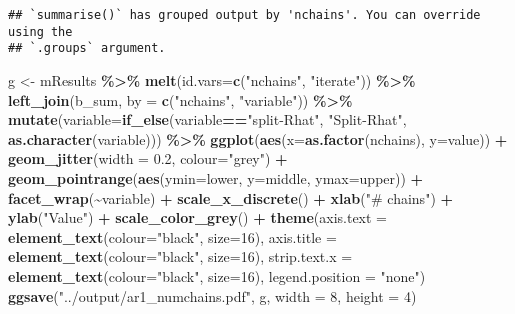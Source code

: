 \documentclass[
]{article}
\newenvironment{Shaded}{\begin{snugshade}}{\end{snugshade}}
\newcommand{\AttributeTok}[1]{\textcolor[rgb]{0.13,0.29,0.53}{#1}}
\newcommand{\DecValTok}[1]{\textcolor[rgb]{0.00,0.00,0.81}{#1}}
\newcommand{\FloatTok}[1]{\textcolor[rgb]{0.00,0.00,0.81}{#1}}
\newcommand{\FunctionTok}[1]{\textcolor[rgb]{0.13,0.29,0.53}{\textbf{#1}}}
\newcommand{\NormalTok}[1]{#1}
\newcommand{\OtherTok}[1]{\textcolor[rgb]{0.56,0.35,0.01}{#1}}
\newcommand{\SpecialCharTok}[1]{\textcolor[rgb]{0.81,0.36,0.00}{\textbf{#1}}}
\newcommand{\StringTok}[1]{\textcolor[rgb]{0.31,0.60,0.02}{#1}}
\begin{document}
\begin{verbatim}
## `summarise()` has grouped output by 'nchains'. You can override using the
## `.groups` argument.
\end{verbatim}

\begin{Shaded}
\begin{Highlighting}[]
\NormalTok{g }\OtherTok{\textless{}{-}}\NormalTok{ mResults }\SpecialCharTok{\%\textgreater{}\%} 
  \FunctionTok{melt}\NormalTok{(}\AttributeTok{id.vars=}\FunctionTok{c}\NormalTok{(}\StringTok{"nchains"}\NormalTok{, }\StringTok{"iterate"}\NormalTok{)) }\SpecialCharTok{\%\textgreater{}\%} 
  \FunctionTok{left\_join}\NormalTok{(b\_sum, }\AttributeTok{by =} \FunctionTok{c}\NormalTok{(}\StringTok{"nchains"}\NormalTok{, }\StringTok{"variable"}\NormalTok{)) }\SpecialCharTok{\%\textgreater{}\%} 
  \FunctionTok{mutate}\NormalTok{(}\AttributeTok{variable=}\FunctionTok{if\_else}\NormalTok{(variable}\SpecialCharTok{==}\StringTok{"split{-}Rhat"}\NormalTok{, }\StringTok{"Split{-}Rhat"}\NormalTok{, }\FunctionTok{as.character}\NormalTok{(variable))) }\SpecialCharTok{\%\textgreater{}\%} 
  \FunctionTok{ggplot}\NormalTok{(}\FunctionTok{aes}\NormalTok{(}\AttributeTok{x=}\FunctionTok{as.factor}\NormalTok{(nchains), }\AttributeTok{y=}\NormalTok{value)) }\SpecialCharTok{+}
  \FunctionTok{geom\_jitter}\NormalTok{(}\AttributeTok{width =} \FloatTok{0.2}\NormalTok{, }\AttributeTok{colour=}\StringTok{"grey"}\NormalTok{) }\SpecialCharTok{+}
  \FunctionTok{geom\_pointrange}\NormalTok{(}\FunctionTok{aes}\NormalTok{(}\AttributeTok{ymin=}\NormalTok{lower, }\AttributeTok{y=}\NormalTok{middle, }\AttributeTok{ymax=}\NormalTok{upper)) }\SpecialCharTok{+}
  \FunctionTok{facet\_wrap}\NormalTok{(}\SpecialCharTok{\textasciitilde{}}\NormalTok{variable) }\SpecialCharTok{+}
  \FunctionTok{scale\_x\_discrete}\NormalTok{() }\SpecialCharTok{+}
  \FunctionTok{xlab}\NormalTok{(}\StringTok{"\# chains"}\NormalTok{) }\SpecialCharTok{+}
  \FunctionTok{ylab}\NormalTok{(}\StringTok{"Value"}\NormalTok{) }\SpecialCharTok{+}
  \FunctionTok{scale\_color\_grey}\NormalTok{() }\SpecialCharTok{+}
  \FunctionTok{theme}\NormalTok{(}\AttributeTok{axis.text =} \FunctionTok{element\_text}\NormalTok{(}\AttributeTok{colour=}\StringTok{"black"}\NormalTok{, }\AttributeTok{size=}\DecValTok{16}\NormalTok{),}
        \AttributeTok{axis.title =} \FunctionTok{element\_text}\NormalTok{(}\AttributeTok{colour=}\StringTok{"black"}\NormalTok{, }\AttributeTok{size=}\DecValTok{16}\NormalTok{),}
        \AttributeTok{strip.text.x =} \FunctionTok{element\_text}\NormalTok{(}\AttributeTok{colour=}\StringTok{"black"}\NormalTok{, }\AttributeTok{size=}\DecValTok{16}\NormalTok{),}
        \AttributeTok{legend.position =} \StringTok{"none"}\NormalTok{)}
\FunctionTok{ggsave}\NormalTok{(}\StringTok{"../output/ar1\_numchains.pdf"}\NormalTok{, g, }\AttributeTok{width =} \DecValTok{8}\NormalTok{, }\AttributeTok{height =} \DecValTok{4}\NormalTok{)}
\end{Highlighting}
\end{Shaded}
\end{document}
